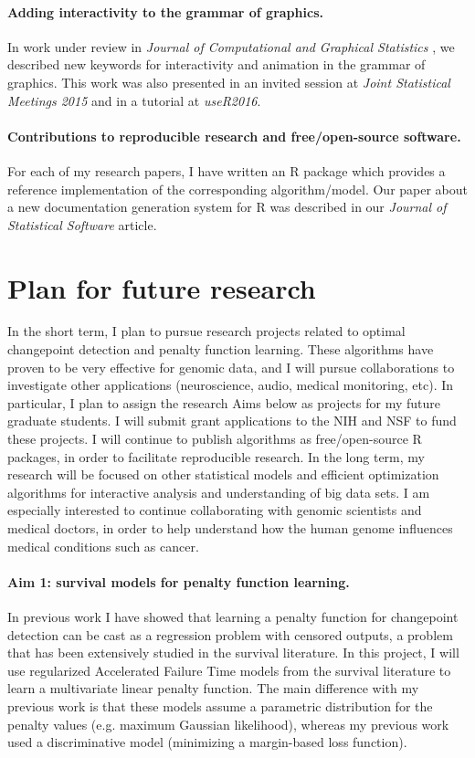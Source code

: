 \documentclass{article}
\begin{document}
\paragraph{Adding interactivity to the grammar of graphics.} In work
under review in \emph{Journal of Computational and Graphical
  Statistics} \citep{animint}, we described new keywords for
interactivity and animation in the grammar of graphics. This work was
also presented in an invited session at \emph{Joint Statistical
  Meetings 2015} and in a tutorial at \emph{useR2016}.

\paragraph{Contributions to reproducible research and free/open-source
  software.} For each of my research papers, I have written an R
package which provides a reference implementation of the corresponding
algorithm/model. Our paper about a new documentation generation system
for R was described in our \emph{Journal of Statistical Software}
\citep{hocking13:inlinedocs} article.

\section{Plan for future research}

In the short term, I plan to pursue research projects related to
optimal changepoint detection and penalty function learning. These
algorithms have proven to be very effective for genomic data, and I
will pursue collaborations to investigate other applications
(neuroscience, audio, medical monitoring, etc). In particular, I plan
to assign the research Aims below as projects for my future graduate
students. I will submit grant applications to the NIH and NSF to fund
these projects. I will continue to publish algorithms as
free/open-source R packages, in order to facilitate reproducible
research. In the long term, my research will be focused on other
statistical models and efficient optimization algorithms for
interactive analysis and understanding of big data sets. I am
especially interested to continue collaborating with genomic
scientists and medical doctors, in order to help understand how the human
genome influences medical conditions such as cancer.


\paragraph{Aim 1: survival models for penalty function learning.} In
previous work I have showed that learning a penalty function for
changepoint detection can be cast as a regression problem with
censored outputs, a problem that has been extensively studied in the
survival literature. In this project, I will use regularized Accelerated Failure
Time models from the survival literature to learn a multivariate
linear penalty function. The main difference with my previous work is
that these models assume a parametric distribution for the penalty values
(e.g. maximum Gaussian likelihood), whereas my previous
work used a discriminative model (minimizing a margin-based loss
function).
\end{document}

